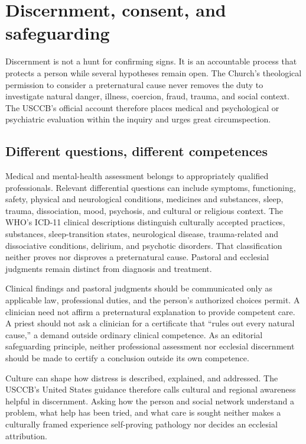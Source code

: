 \section{Discernment, consent, and safeguarding}

Discernment is not a hunt for confirming signs. It is an accountable process
that protects a person while several hypotheses remain open. The Church's
theological permission to consider a preternatural cause never removes the
duty to investigate natural danger, illness, coercion, fraud, trauma, and
social context. The USCCB's official account therefore places medical and
psychological or psychiatric evaluation within the inquiry and urges great
circumspection.

\subsection{Different questions, different competences}

Medical and mental-health assessment belongs to appropriately qualified
professionals. Relevant differential questions can include symptoms,
functioning, safety, physical and neurological conditions, medicines and
substances, sleep, trauma, dissociation, mood, psychosis, and cultural or
religious context. The WHO's ICD-11 clinical descriptions distinguish
culturally accepted practices, substances, sleep-transition states,
neurological disease, trauma-related and dissociative conditions, delirium,
and psychotic disorders. That classification neither proves nor disproves a
preternatural cause. Pastoral and ecclesial judgments remain distinct from
diagnosis and treatment.

Clinical findings and pastoral judgments should be communicated only as
applicable law, professional duties, and the person's authorized choices permit.
A clinician need not affirm a
preternatural explanation to provide competent care. A priest should not ask a
clinician for a certificate that ``rules out every natural cause,'' a demand
outside ordinary clinical competence. As an editorial safeguarding principle,
neither professional assessment nor ecclesial discernment should be made to
certify a conclusion outside its own competence.

Culture can shape how distress is described, explained, and addressed. The
USCCB's United States guidance therefore calls cultural and regional awareness
helpful in discernment. Asking how the person and social network understand a
problem, what help has been tried, and what care is sought neither makes a
culturally framed experience self-proving pathology nor decides an ecclesial
attribution.

